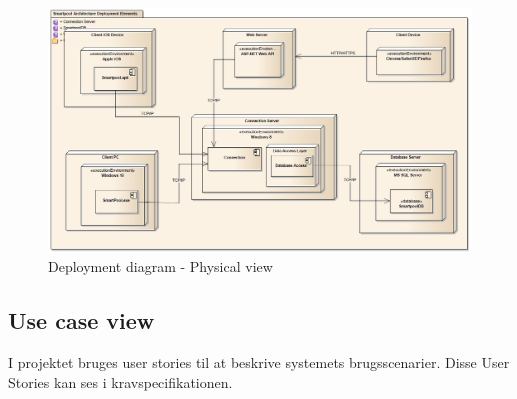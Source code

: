\begin{figure}
	\centering
	\includegraphics[width=\linewidth]{figs/arkitektur/deploymentView.PNG}
	\caption{Deployment diagram - Physical view}
	\label{fig:deploymentView}
\end{figure}

\subsection{Use case view}
I projektet bruges user stories til at beskrive systemets brugsscenarier. Disse User Stories kan ses i kravspecifikationen.

